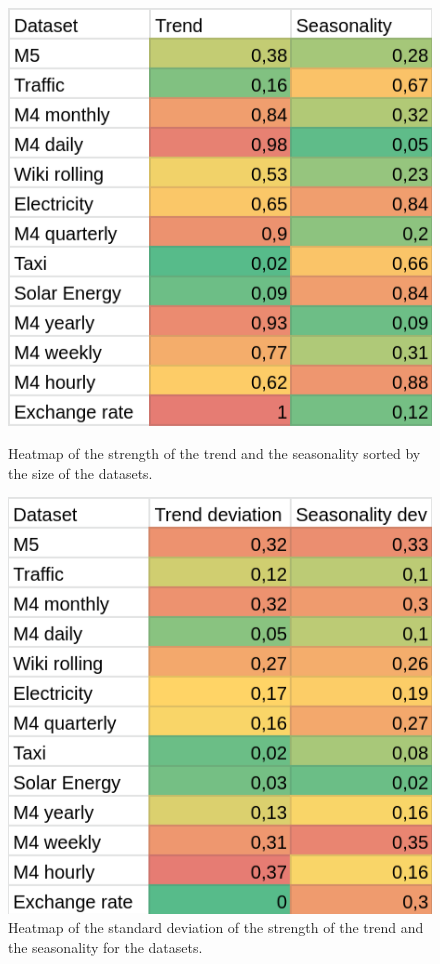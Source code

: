 \begin{figure}[htb]
    \centering
        \includegraphics[width=\linewidth]{4_designing/figures/dataset_trend_seasonality_heatmap_mean.png}
        \caption{Heatmap of the strength of the trend and the seasonality sorted by the size of the datasets.}
    \endminipage\hfill
        \includegraphics[width=\linewidth]{4_designing/figures/dataset_trend_seasonality_heatmap_deviation.png}
        \caption{Heatmap of the standard deviation of the strength of the trend and the seasonality for the datasets.}
    \endminipage\hfill
\end{figure}
\label{heatmap_strengths}


